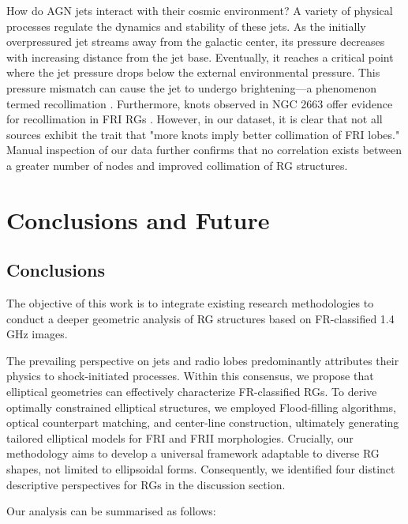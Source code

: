 \documentclass{aa}
\begin{document}
How do AGN jets interact with their cosmic environment? A variety of physical processes regulate the dynamics and stability of these jets. As the initially overpressured jet streams away from the galactic center, its pressure decreases with increasing distance from the jet base. Eventually, it reaches a critical point where the jet pressure drops below the external environmental pressure. This pressure mismatch can cause the jet to undergo brightening—a phenomenon termed recollimation \citep[e.g.,][]{mizuno_recollimation_2015}. Furthermore, knots observed in NGC 2663 offer evidence for recollimation in FRI RGs \citep{velovic_collimation_2022}. However, in our dataset, it is clear that not all sources exhibit the trait that "more knots imply better collimation of FRI lobes." Manual inspection of our data further confirms that no correlation exists between a greater number of nodes and improved collimation of RG structures.




\section{Conclusions and Future} \label{sec:Conclusions and Future}

\subsection{Conclusions}\label{sec:Conclusions}

The objective of this work is to integrate existing research methodologies to conduct a deeper geometric analysis of RG structures based on FR-classified 1.4 GHz images.

The prevailing perspective on jets and radio lobes predominantly attributes their physics to shock-initiated processes. Within this consensus, we propose that elliptical geometries can effectively characterize FR-classified RGs. To derive optimally constrained elliptical structures, we employed Flood-filling algorithms, optical counterpart matching, and center-line construction, ultimately generating tailored elliptical models for FRI and FRII morphologies. Crucially, our methodology aims to develop a universal framework adaptable to diverse RG shapes, not limited to ellipsoidal forms. Consequently, we identified four distinct descriptive perspectives for RGs in the discussion section.


Our analysis can be summarised as follows:
\end{document}
